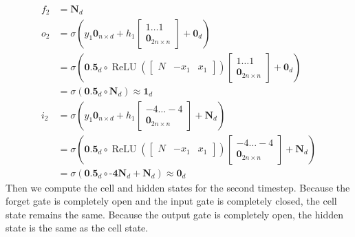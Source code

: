 \documentclass{article}
\DeclareMathOperator{\ReLU}{ReLU}
\begin{document}
\begin{align*}
  f_2 &= \textbf{N}_d \\[2ex]
  o_2 &= \sigma(y_1\textbf{0}_{n\times d} + h_{1}\begin{bmatrix} 1 \dots 1 \\ \textbf{0}_{2n\times n} \end{bmatrix}  + \textbf{0}_d) \\
  &= \sigma(\textbf{0.5}_d\circ \ReLU\left( \begin{bmatrix} N & -x_1 & x_1 \end{bmatrix}\right)\begin{bmatrix} 1 \dots 1 \\ \textbf{0}_{2n\times n} \end{bmatrix}  + \textbf{0}_d)  \\
  &=  \sigma(\textbf{0.5}_d\circ \textbf{N}_d) \approx \textbf{1}_d \\[2ex]
  i_2 &= \sigma(y_1\textbf{0}_{n\times d} + h_{1}\begin{bmatrix} -4 \dots -4 \\ \textbf{0}_{2n\times n} \end{bmatrix}  + \textbf{N}_d)  \\
  &= \sigma(\textbf{0.5}_d\circ \ReLU\left( \begin{bmatrix} N & -x_1 & x_1 \end{bmatrix}\right)\begin{bmatrix} -4 \dots -4 \\ \textbf{0}_{2n\times n} \end{bmatrix}  + \textbf{N}_d)   \\
  &=  \sigma(\textbf{0.5}_d\circ\textbf{-4N}_d + \textbf{N}_d) \approx \textbf{0}_d
\end{align*}
%
Then we compute the cell and hidden states for the second timestep. Because the forget gate is completely open and the input gate is completely closed, the cell state remains the same. Because the output gate is completely open, the hidden state is the same as the cell state.
%
\end{document}
